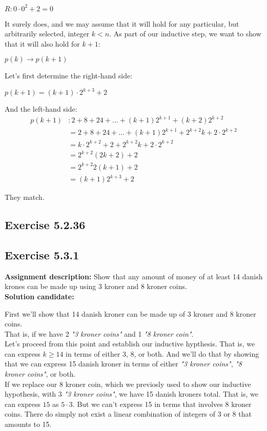 \documentclass{report}
\newcommand{\cent}[1]{\begin{center}#1\end{center}}
\newcommand{\mAlign}[1]{\begin{align*}#1\end{align*}}
\newcommand{\assignmentDescription}{\textbf{Assignment description: }}
\newcommand{\solution}{\textbf{Solution candidate: }}
\newcommand{\QED}{\boxed{}}
\newcommand{\Exercise}[1]{\subsection{Exercise #1}}
\begin{document}
 	\cent{$R : 0 \cdot 0^2 + 2 = 0$}
 	
 	It surely does, and we may assume that it will hold for any particular, but arbitrarily selected, integer $k < n$. As part of our inductive step, we want to show that it will also hold for $k+1$:
 	
 	\cent{$p(k) \to p(k+1) $}
 	
 	Let's first determine the right-hand side:
 	
 	\cent{$p(k+1) = (k+1) \cdot 2^{k+3}+2$}
 	
 	And the left-hand side:
 	\mAlign{
 		p(k+1) &: 2 + 8 + 24 + \dots + (k+1) 2^{k+1} + (k+2) 2^{k+2} \\
 		&= 2 + 8 + 24 + \dots + (k+1) 2^{k+1} + 2^{k+2}k + 2 \cdot 2^{k+2} \\
 		&= k \cdot 2^{k+2} + 2 + 2^{k+2}k + 2 \cdot 2^{k+2} \\
 		&=  2^{k+2} (2k + 2) + 2 \\
 		&= 2^{k+2}2 (k + 1) + 2 \\
 		&= (k + 1) 2^{k+3} + 2
 	} 
 	
 	They match.\\
 	
 	\QED
 	
 	\Exercise{5.2.36}
 	
 	\Exercise{5.3.1}
 	
 	\assignmentDescription
 	Show that any amount of money of at least 14 danish krones can be made up using 3 kroner  and 8 kroner coins.\\
 	
 	\solution
 	
 	First we'll show that 14 danish kroner can be made up of 3 kroner and 8 kroner coins.\\
 	
 	That is, if we have 2 \textit{"3 kroner coins"} and 1 \textit{"8 kroner coin"}.\\
 	
 	Let's proceed from this point and establish our inductive hypthesis. That is, we can express $k\geq 14$ in terms of either $3$, $8$, or both. And we'll do that by showing that we can express 15 danish kroner in terms of either \textit{"3 kroner coins"}, \textit{"8 kroner coins"}, or both.\\
 	
 	If we replace our 8 kroner coin, which we previosly used to show our inductive hypothesis, with 3 \textit{"3 kroner coins"}, we have 15 danish kroners total. That is, we can express $15$ as $5 \cdot 3$. But we can't express 15 in terms that involves  8 kroner coins. There do simply not exist a linear combination of integers of 3 or 8 that amounts to 15. \\
 	
\end{document}
